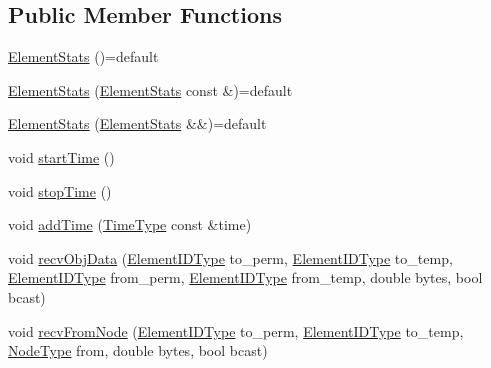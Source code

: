\subsection*{Public Member Functions}
\begin{DoxyCompactItemize}
\item 
\hyperlink{structvt_1_1vrt_1_1collection_1_1balance_1_1_element_stats_a4d88e9b2f7981d7f98889fa9bea01d73}{Element\+Stats} ()=default
\item 
\hyperlink{structvt_1_1vrt_1_1collection_1_1balance_1_1_element_stats_a7d0f1ce4fdc1450c45da136137d11ece}{Element\+Stats} (\hyperlink{structvt_1_1vrt_1_1collection_1_1balance_1_1_element_stats}{Element\+Stats} const \&)=default
\item 
\hyperlink{structvt_1_1vrt_1_1collection_1_1balance_1_1_element_stats_ae99f86097df6e28374b3a0e7f8ef5b72}{Element\+Stats} (\hyperlink{structvt_1_1vrt_1_1collection_1_1balance_1_1_element_stats}{Element\+Stats} \&\&)=default
\item 
void \hyperlink{structvt_1_1vrt_1_1collection_1_1balance_1_1_element_stats_ad9489efefecb108cc677812f89475b9f}{start\+Time} ()
\item 
void \hyperlink{structvt_1_1vrt_1_1collection_1_1balance_1_1_element_stats_aca12581fe6da436d4d8dbd76776b7d8a}{stop\+Time} ()
\item 
void \hyperlink{structvt_1_1vrt_1_1collection_1_1balance_1_1_element_stats_aadebe326db328893e6a38413d647c9a1}{add\+Time} (\hyperlink{namespacevt_a876a9d0cd5a952859c72de8a46881442}{Time\+Type} const \&time)
\item 
void \hyperlink{structvt_1_1vrt_1_1collection_1_1balance_1_1_element_stats_afdd59d341ddd577a4652027b132a7c06}{recv\+Obj\+Data} (\hyperlink{namespacevt_1_1vrt_1_1collection_1_1balance_a14c8d2c972f2913aa3f1636e5be0a120}{Element\+I\+D\+Type} to\+\_\+perm, \hyperlink{namespacevt_1_1vrt_1_1collection_1_1balance_a14c8d2c972f2913aa3f1636e5be0a120}{Element\+I\+D\+Type} to\+\_\+temp, \hyperlink{namespacevt_1_1vrt_1_1collection_1_1balance_a14c8d2c972f2913aa3f1636e5be0a120}{Element\+I\+D\+Type} from\+\_\+perm, \hyperlink{namespacevt_1_1vrt_1_1collection_1_1balance_a14c8d2c972f2913aa3f1636e5be0a120}{Element\+I\+D\+Type} from\+\_\+temp, double bytes, bool bcast)
\item 
void \hyperlink{structvt_1_1vrt_1_1collection_1_1balance_1_1_element_stats_af251d52d4d0be99a7745295148abcb4e}{recv\+From\+Node} (\hyperlink{namespacevt_1_1vrt_1_1collection_1_1balance_a14c8d2c972f2913aa3f1636e5be0a120}{Element\+I\+D\+Type} to\+\_\+perm, \hyperlink{namespacevt_1_1vrt_1_1collection_1_1balance_a14c8d2c972f2913aa3f1636e5be0a120}{Element\+I\+D\+Type} to\+\_\+temp, \hyperlink{namespacevt_a866da9d0efc19c0a1ce79e9e492f47e2}{Node\+Type} from, double bytes, bool bcast)

\end{DoxyCompactItemize}
